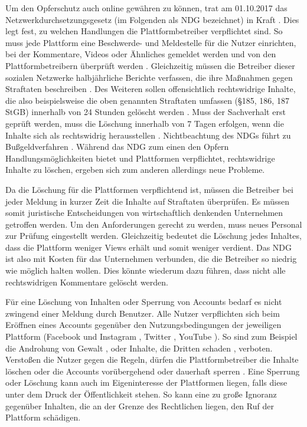 Um den Opferschutz auch online gewähren zu können, trat am 01.10.2017 das Netzwerkdurchsetzungsgesetz (im Folgenden als \glqq NDG\grqq{} bezeichnet) in Kraft \autocite[vgl.][Art. 3]{NetzDGOfficial}. Dies legt fest, zu welchen Handlungen die Plattformbetreiber verpflichtet sind. So muss jede Plattform eine Beschwerde- und Meldestelle für die Nutzer einrichten, bei der Kommentare, Videos oder Ähnliches gemeldet werden und von den Plattformbetreibern überprüft werden \autocite[vgl.][Art. 1 \S 3]{NetzDGOfficial}. Gleichzeitig müssen die Betreiber dieser sozialen Netzwerke halbjährliche Berichte verfassen, die ihre Maßnahmen gegen Straftaten beschreiben \autocite[vgl.][Art. 1 \S 2]{NetzDGOfficial}. Des Weiteren sollen offensichtlich rechtswidrige Inhalte, die also beispielsweise die oben genannten Straftaten umfassen (\S 185, 186, 187 StGB) innerhalb von 24 Stunden gelöscht werden \autocite[vgl.][Art. 1 \S 3 Abs. 2]{NetzDGOfficial}. Muss der Sachverhalt erst geprüft werden, muss die Löschung innerhalb von 7 Tagen erfolgen, wenn die Inhalte sich als rechtswidrig herausstellen \autocite[vgl.][Art. 1 \S 3 Abs. 2]{NetzDGOfficial}. Nichtbeachtung des NDGs führt zu Bußgeldverfahren \autocite[vgl.][Art. 1 \S 4]{NetzDGOfficial}. Während das NDG zum einen den Opfern Handlungsmöglichkeiten bietet und Plattformen verpflichtet, rechtswidrige Inhalte zu löschen, ergeben sich zum anderen allerdings neue Probleme. 

Da die Löschung für die Plattformen verpflichtend ist, müssen die Betreiber bei jeder Meldung in kurzer Zeit die Inhalte auf Straftaten überprüfen. Es müssen somit juristische Entscheidungen von wirtschaftlich denkenden Unternehmen getroffen werden. Um den Anforderungen gerecht zu werden, muss neues Personal zur Prüfung eingestellt werden. Gleichzeitig bedeutet die Löschung jedes Inhaltes, dass die Plattform weniger Views erhält und somit weniger verdient. Das NDG ist also mit Kosten für das Unternehmen verbunden, die die Betreiber so niedrig wie möglich halten wollen. Dies könnte wiederum dazu führen, dass nicht alle rechtswidrigen Kommentare gelöscht werden. 

Für eine Löschung von Inhalten oder Sperrung von Accounts bedarf es nicht zwingend einer Meldung durch Benutzer. Alle Nutzer verpflichten sich beim Eröffnen eines Accounts gegenüber den Nutzungsbedingungen  der jeweiligen Plattform (Facebook und Instagram \autocite[vgl.][]{NutzungsbFacebook} , Twitter \autocite[vgl.][]{TwitterAlg}, YouTube \autocite[vgl.][]{NutzungsbYouTube}). So sind zum Beispiel die Androhung von Gewalt \autocite[vgl.][]{NutzungsbFacebook}, \autocite{TwitterRules} oder Inhalte, die Dritten schaden \autocite[vgl.][]{NutzungsbYouTube}, verboten. Verstoßen die Nutzer gegen die Regeln, dürfen die Plattformbetreiber die Inhalte löschen oder die Accounts vorübergehend oder dauerhaft sperren \autocite[vgl.][]{NutzungsbFacebook}\autocite[vgl.][]{NutzungsbYouTube}\autocite[vgl.][]{TwitterDurchsetzung}. Eine Sperrung oder Löschung kann auch im Eigeninteresse der Plattformen liegen, falls diese unter dem Druck der Öffentlichkeit stehen. So kann eine zu große Ignoranz gegenüber Inhalten, die an der Grenze des Rechtlichen liegen, den Ruf der Plattform schädigen.

